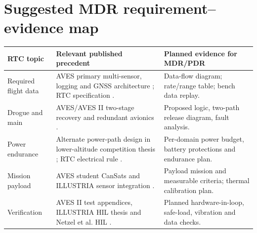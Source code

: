 \documentclass[10pt,a4paper]{article}
\begin{document}
\section{Suggested MDR requirement--evidence map}
\small
\begin{tabularx}{\linewidth}{@{}L{25mm}Y L{47mm}@{}}
\toprule{}\textbf{RTC topic} & \textbf{Relevant published precedent} & \textbf{Planned evidence for MDR/PDR}\\\midrule
Required flight data & AVES primary multi-sensor, logging and GNSS architecture \cite{astg2021aves}; RTC specification \cite{rtc2027rules}. & Data-flow diagram; rate/range table; bench data replay.\\
Drogue and main & AVES/AVES II two-stage recovery and redundant avionics \cite{astg2021aves,astg2022aves2}. & Proposed logic, two-path release diagram, fault analysis.\\
Power endurance & Alternate power-path design in lower-altitude competition thesis \cite{zapadlo2023}; RTC electrical rule \cite{rtc2027rules}. & Per-domain power budget, battery protections and endurance plan.\\
Mission payload & AVES student CanSats and ILLUSTRIA sensor integration \cite{astg2021aves,zlamala2024}. & Payload mission and measurable criteria; thermal calibration plan.\\
Verification & AVES II test appendices, ILLUSTRIA HIL thesis and Netzel et al. HIL \cite{astg2022aves2,zlamala2024,netzel2026}. & Planned hardware-in-loop, safe-load, vibration and data checks.\\
\bottomrule
\end{tabularx}
\normalsize
\end{document}

